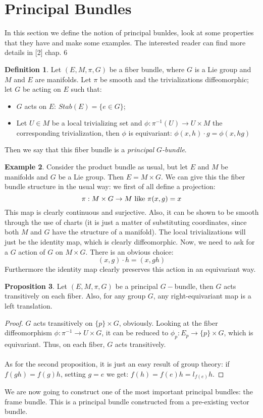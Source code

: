 \documentclass[12pt,a4paper]{report}
\theoremstyle{definition}
\newtheorem{Def}{Definition}[chapter]
\theoremstyle{Theorem}
\newtheorem{Prop}[Def]{Proposition}
\theoremstyle{definition}
\newtheorem{Ex}[Def]{Example}
\theoremstyle{definition}
\begin{document}
		\section{Principal Bundles}
		In this section we define the notion of principal bunldes, look at some properties that they have and make some examples. The interested reader can find more details in [2] chap. 6
		\begin{Def}
			Let $(E,M,\pi,G)$ be a fiber bundle, where $G$ is a Lie group and $M$ and $E$ are manifolds. Let $\pi$ be smooth and the trivializations diffeomorphic; let $G$ be acting on $E$ such that:
			\begin{itemize}
				\item $G$ acts on $E$: $Stab(E)=\{e\in G\}$;
				\item Let $U\in M$ be a local trivializing set and $\phi:\pi^{-1}(U)\rightarrow U\times M$  the corresponding trivialization, then $\phi$ is equivariant: $\phi(x,h)\cdot g=\phi(x,hg)$
			\end{itemize} 
			Then we say that this fiber bundle is a \textit{principal $G$-bundle}.
		\end{Def}
		\begin{Ex}
			Consider the product bundle as usual, but let $E$ and $M$ be manifolds and $G$ be a Lie group. Then $E=M\times G$. We can give this the fiber bundle structure in the usual way: we first of all define a projection:
			$$\pi:M\times G\rightarrow M\hbox{ like }\pi(x,g)=x$$
			This map is clearly continuous and surjective. Also, it can be shown to be smooth through the use of charts (it is just a matter of substituting coordinates, since both $M$ and $G$ have the structure of a manifold). The local trivializations will just be the identity map, which is clearly diffeomorphic. Now, we need to ask for a $G$ action of $G$ on $M\times G$. There is an obvious choice:
			$$(x,g)\cdot h=(x,gh)$$
			Furthermore the identity map clearly preserves this action in an equivariant way.
		\end{Ex}
		\begin{Prop}
			Let $(E,M,\pi,G)$ be a principal $G-$bundle, then $G$ acts transitively on each fiber. Also, for any group $G$, any right-equivariant map is a left translation.
		\end{Prop}
		\begin{proof}
			$G$ acts transitively on $\{p\} \times G$, obviously. Looking at the fiber diffeomorphism $\phi:\pi^{-1}\rightarrow U\times G$, it can be reduced to $\phi_p:E_p\rightarrow \{p\}\times G$, which is equivariant. Thus, on each fiber, $G$ acts transitively.\\
			\\
			As for the second proposition, it is just an easy result of group theory: if $f(gh)=f(g)h$, setting $g=e$ we get: $f(h)=f(e)h=l_{f(e)}h$.
		\end{proof}
		We are now going to construct one of the most important principal bundles: the frame bundle. This is a principal bundle constructed from a pre-existing vector bundle.
\end{document}
